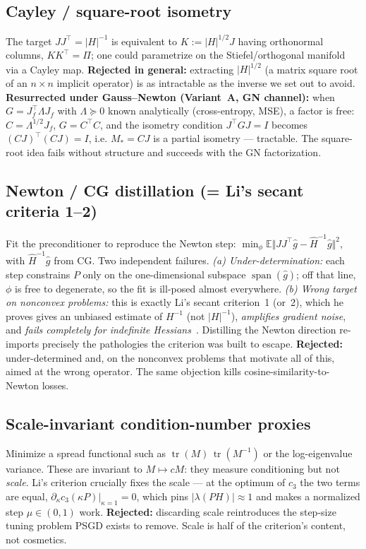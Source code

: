 \documentclass[11pt]{article}
\theoremstyle{plain}
\theoremstyle{definition}
\theoremstyle{remark}
\DeclareMathOperator{\tr}{tr}
\DeclareMathOperator{\spn}{span}
\newcommand{\E}{\mathbb{E}}
\begin{document}
\subsection{Cayley / square-root isometry}
\label{sub:cayley}
The target $JJ^{\!\top}=|H|^{-1}$ is equivalent to $K:=|H|^{1/2}J$ having orthonormal
columns, $KK^{\!\top}=\Pi$; one could parametrize on the Stiefel/orthogonal manifold via a
Cayley map. \textbf{Rejected in general:} extracting $|H|^{1/2}$ (a matrix square root of an
$n\times n$ implicit operator) is as intractable as the inverse we set out to avoid.
\textbf{Resurrected under Gauss--Newton (Variant~A, GN channel):} when $G=J_f^{\!\top}\Lambda J_f$
with $\Lambda\succeq0$ known analytically (cross-entropy, MSE), a factor is free:
$C=\Lambda^{1/2}J_f$, $G=C^{\!\top}C$, and the isometry condition $J^{\!\top}GJ=I$ becomes
$(CJ)^{\!\top}(CJ)=I$, i.e. $M_{\!*}=CJ$ is a partial isometry --- tractable. The square-root
idea fails without structure and succeeds with the GN factorization.

\subsection{Newton / CG distillation (= Li's secant criteria 1--2)}
\label{sub:distill}
Fit the preconditioner to reproduce the Newton step:
$\min_\phi\E\big\Vert JJ^{\!\top}\hat g-\hat H^{-1}\hat g\big\Vert^2$, with $\hat H^{-1}\hat g$
from CG. Two independent failures. \emph{(a) Under-determination:} each step constrains $P$
only on the one-dimensional subspace $\spn(\hat g)$; off that line, $\phi$ is free to
degenerate, so the fit is ill-posed almost everywhere. \emph{(b) Wrong target on
nonconvex problems:} this is exactly Li's secant criterion~1 (or~2), which he proves gives
an unbiased estimate of $H^{-1}$ (not $|H|^{-1}$), \emph{amplifies gradient noise}, and
\emph{fails completely for indefinite Hessians}~\cite{li2015}. Distilling the Newton
direction re-imports precisely the pathologies the criterion was built to escape.
\textbf{Rejected:} under-determined and, on the nonconvex problems that motivate all of
this, aimed at the wrong operator. The same objection kills cosine-similarity-to-Newton
losses.

\subsection{Scale-invariant condition-number proxies}
\label{sub:condnum}
Minimize a spread functional such as $\tr(M)\,\tr(M^{-1})$ or the log-eigenvalue variance.
These are invariant to $M\mapsto cM$: they measure conditioning but not \emph{scale}.
Li's criterion crucially fixes the scale --- at the optimum of $c_3$ the two terms are
equal, $\partial_\kappa c_3(\kappa P)|_{\kappa=1}=0$, which pins $|\lambda(PH)|\approx1$ and
makes a normalized step $\mu\in(0,1)$ work. \textbf{Rejected:} discarding scale
reintroduces the step-size tuning problem PSGD exists to remove. Scale is half of the
criterion's content, not cosmetics.
\end{document}

